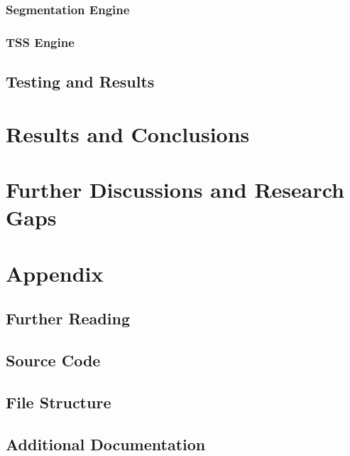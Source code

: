 \documentclass[11pt,a4paper]{report}
\begin{document}
\subsection{Segmentation Engine}

\subsection{TSS Engine}

\section{Testing and Results}

\chapter{Results and Conclusions}
\label{chap:results}

\chapter{Further Discussions and Research Gaps}
\label{chap:discussion}

\appendix
\chapter{Appendix}
\label{chap:appendix}
\section{Further Reading}

\section{Source Code}

\section{File Structure}

\section{Additional Documentation}



\end{document}
